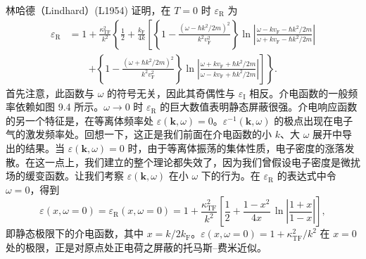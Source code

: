林哈德（Lindhard）(L1954) 证明，在 $T=0$ 时 $\varepsilon_{\mathrm{R}}$ 为
\begin{equation*}
\begin{aligned}
\varepsilon_{\mathrm{R}}&=1+\frac{\kappa_{\mathrm{TF}}^2}{k^2}\left\{\frac{1}{2}+\frac{k_{\mathrm{F}}}{4k}\left[\left\{1-\frac{\left(\omega-\hbar k^2/2m\right)^2}{k^2v_{\mathrm{F}}^2}\right\}\ln\left|\frac{\omega-kv_{\mathrm{F}}-\hbar k^2/2m}{\omega+kv_{\mathrm{F}}-\hbar k^2/2m}\right|\right.\right.\\
&\qquad\left.\left.+\left\{1-\frac{\left(\omega+\hbar k^2/2m\right)^2}{k^2v_{\mathrm{F}}^2}\right\}\ln\left|\frac{\omega+kv_{\mathrm{F}}+\hbar k^2/2m}{\omega-kv_{\mathrm{F}}+\hbar k^2/2m}\right|\right]\right\}.
\end{aligned}\tag{9.122}
\end{equation*}
首先注意，此函数与 $\omega$ 的符号无关，因此其奇偶性与 $\varepsilon_{\mathrm{I}}$ 相反。介电函数的一般频率依赖如图 9.4 所示。$\omega\to 0$ 时 $\varepsilon_{\mathrm{R}}$ 的巨大数值表明静态屏蔽很强。介电响应函数的另一个特征是，在等离体频率处 $\varepsilon(\mathbf{k},\omega)=0$。$\varepsilon^{-1}(\mathbf{k},\omega)$ 的极点出现在电子气的激发频率处。回想一下，这正是我们前面在介电函数的小 $k$、大 $\omega$ 展开中导出的结果。当 $\varepsilon(\mathbf{k},\omega)=0$ 时，由于等离体振荡的集体性质，电子密度的涨落发散。在这一点上，我们建立的整个理论都失效了，因为我们曾假设电子密度是微扰场的缓变函数。让我们考察 $\varepsilon(\mathbf{k},\omega)$ 在小 $\omega$ 下的行为。在 $\varepsilon_{\mathrm{R}}$ 的表达式中令 $\omega=0$，得到
\begin{equation*}
\varepsilon(x,\omega=0)=\varepsilon_{\mathrm{R}}(x,\omega=0)=1+\frac{\kappa_{\mathrm{TF}}^2}{k^2}\left[\frac{1}{2}+\frac{1-x^2}{4x}\,\ln\left|\frac{1+x}{1-x}\right|\right],\tag{9.123}
\end{equation*}
即静态极限下的介电函数，其中 $x=k/2k_{\mathrm{F}}$。$\varepsilon(x,\omega=0)=1+\kappa_{\mathrm{TF}}^2/k^2$ 在 $x=0$ 处的极限，正是对原点处正电荷之屏蔽的托马斯–费米近似。

